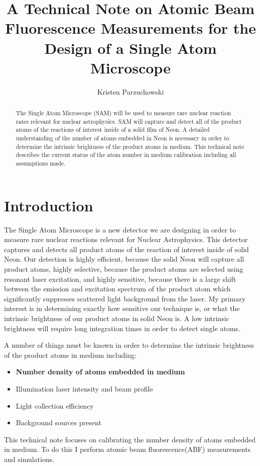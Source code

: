\documentclass[12pt, a4paper]{article}
\title{A Technical Note on Atomic Beam Fluorescence Measurements for the Design of a Single Atom Microscope}
\author{Kristen Parzuchowski}
\begin{document}
\maketitle
\begin{abstract}
The Single Atom Microscope (SAM) will be used to measure rare nuclear reaction rates relevant for nuclear astrophysics. SAM will capture and detect all of the product atoms of the reactions of interest inside of a solid film of Neon. A detailed understanding of the number of atoms embedded in Neon is necessary in order to determine the intrinsic brightness of the product atoms in medium. This technical note describes the current status of the atom number in medium calibration including all assumptions made.
\end{abstract}
\section{Introduction}
The Single Atom Microscope is a new detector we are designing in order to measure rare nuclear reactions relevant for Nuclear Astrophysics. This detector captures and detects all product atoms of the reaction of interest inside of solid Neon. Our detection is highly efficient, because the solid Neon will capture all product atoms, highly selective, because the product atoms are selected using resonant laser excitation, and highly sensitive, because there is a large shift between the emission and excitation spectrum of the product atom which significantly suppresses scattered light background from the laser. My primary interest is in determining exactly how sensitive our technique is, or what the intrinsic brightness of our product atoms in solid Neon is. A low intrinsic brightness will require long integration times in order to detect single atoms. 

A number of things must be known in order to determine the intrinsic brightness of the product atoms in medium including:
\begin{itemize}
\item \textbf{Number density of atoms embedded in medium}
\item Illumination laser intensity and beam profile
\item Light collection efficiency
\item Background sources present
\end{itemize}
This technical note focuses on calibrating the number density of atoms embedded in medium. To do this I perform atomic beam fluorescence(ABF) measurements and simulations. 
\end{document}

